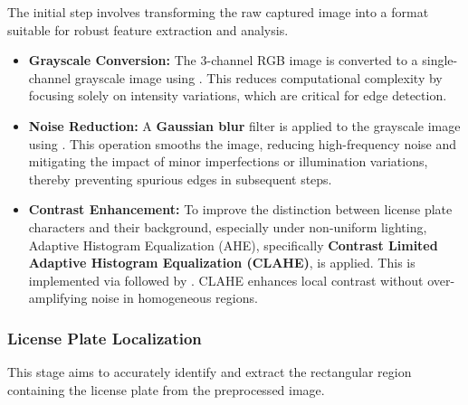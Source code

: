 The initial step involves transforming the raw captured image into a format suitable for robust feature extraction and analysis.

\begin{itemize}
    \item \textbf{Grayscale Conversion:} The 3-channel RGB image is converted to a single-channel grayscale image using . This reduces computational complexity by focusing solely on intensity variations, which are critical for edge detection.
    \item \textbf{Noise Reduction:} A \textbf{Gaussian blur} filter is applied to the grayscale image using . This operation smooths the image, reducing high-frequency noise and mitigating the impact of minor imperfections or illumination variations, thereby preventing spurious edges in subsequent steps.
    \item \textbf{Contrast Enhancement:} To improve the distinction between license plate characters and their background, especially under non-uniform lighting, Adaptive Histogram Equalization (AHE), specifically \textbf{Contrast Limited Adaptive Histogram Equalization (CLAHE)}, is applied. This is implemented via  followed by . CLAHE enhances local contrast without over-amplifying noise in homogeneous regions.
\end{itemize}

\subsubsection{License Plate Localization}
\label{subsubsec:localization}

This stage aims to accurately identify and extract the rectangular region containing the license plate from the preprocessed image.

